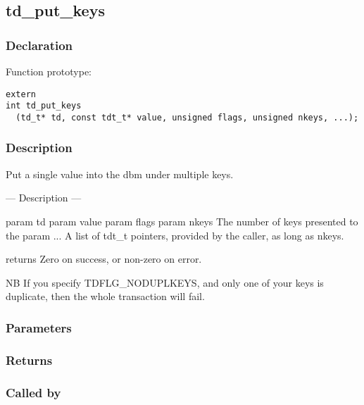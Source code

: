 
\newpage
\subsection{td\_put\_keys}
\subsubsection{Declaration} Function prototype:

\begin{verbatim}
extern
int td_put_keys
  (td_t* td, const tdt_t* value, unsigned flags, unsigned nkeys, ...);
\end{verbatim}

\subsubsection{Description}


 Put a single value into the dbm under multiple keys.
 
 --- Description ---

 param td
 param value
 param flags
 param nkeys The number of keys presented to the
 param ... A list of tdt\_t pointers, provided by the caller,
 as long as nkeys.

 returns Zero on success, or non-zero on error.

 NB If you specify TDFLG\_NODUPLKEYS, and only one of your keys
 is duplicate, then the whole transaction will fail.
 

\subsubsection{Parameters}
\subsubsection{Returns}
\subsubsection{Called by}

